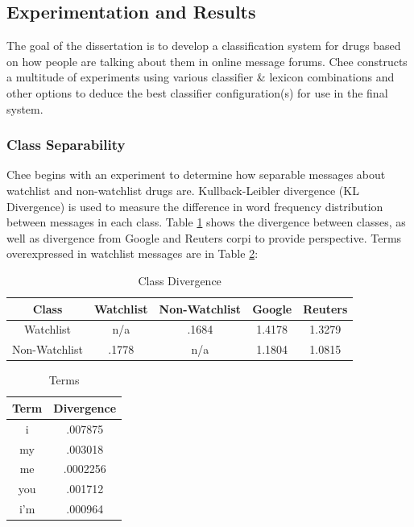 \documentclass[twoside,11pt]{article}
\begin{document}
\subsection{Experimentation and Results}
The goal of the dissertation is to develop a classification system for drugs based on how people are talking about them in online message forums. Chee constructs a multitude of experiments using various classifier & lexicon combinations and other options to deduce the best classifier configuration(s) for use in the final system.

\subsubsection{Class Separability}
Chee begins with an experiment to determine how separable messages about watchlist and non-watchlist drugs are. Kullback-Leibler divergence (KL Divergence) is used to measure the difference in word frequency distribution between messages in each class. Table \ref{table2} shows the divergence between classes, as well as divergence from Google and Reuters corpi to provide perspective. Terms overexpressed in watchlist messages are in Table \ref{table3}:
\begin{minipage}{0.75\textwidth}
  \begin{table}[H]
    \caption{Class Divergence}
    \label{table2}
    \begin{tabular}{||c|c|c|c|c||}
      \hline
      Class & Watchlist & Non-Watchlist & Google & Reuters \\
      \hline\hline
      Watchlist & n/a & .1684 & 1.4178 & 1.3279 \\
      \hline
      Non-Watchlist & .1778 & n/a & 1.1804 & 1.0815 \\
      \hline
    \end{tabular}
  \end{table}
\end{minipage}
\begin{minipage}{0.25\textwidth}
  \begin{table}[H]
    \caption{Terms}
    \label{table3}
    \begin{tabular}{||c|c||}
      \hline
      Term & Divergence \\
      \hline\hline
      i & .007875 \\
      \hline
      my & .003018 \\
      \hline
      me & .0002256 \\
      \hline
      you & .001712 \\
      \hline
      i'm & .000964 \\
      \hline
    \end{tabular}
  \end{table}
\end{minipage}
\end{document}
